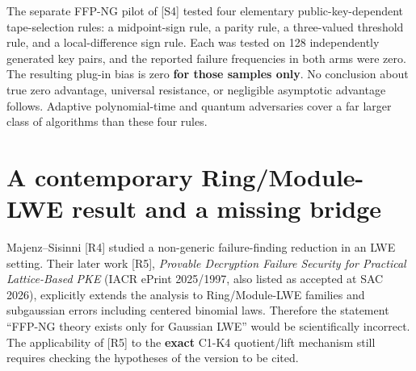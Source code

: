 \documentclass[
  11pt,
  a4paper,
  oneside]{report}
\begin{document}
The separate FFP-NG pilot of {[}S4{]} tested four elementary
public-key-dependent tape-selection rules: a midpoint-sign rule, a
parity rule, a three-valued threshold rule, and a local-difference sign
rule. Each was tested on 128 independently generated key pairs, and the
reported failure frequencies in both arms were zero. The resulting
plug-in bias is zero \textbf{for those samples only}. No conclusion
about true zero advantage, universal resistance, or negligible
asymptotic advantage follows. Adaptive polynomial-time and quantum
adversaries cover a far larger class of algorithms than these four
rules.

\section{A contemporary Ring/Module-LWE result and a missing
bridge}\label{a-contemporary-ringmodule-lwe-result-and-a-missing-bridge}

Majenz--Sisinni {[}R4{]} studied a non-generic failure-finding reduction
in an LWE setting. Their later work {[}R5{]}, \emph{Provable Decryption
Failure Security for Practical Lattice-Based PKE} (IACR ePrint
2025/1997, also listed as accepted at SAC 2026), explicitly extends the
analysis to Ring/Module-LWE families and subgaussian errors including
centered binomial laws. Therefore the statement ``FFP-NG theory exists
only for Gaussian LWE'' would be scientifically incorrect. The
applicability of {[}R5{]} to the \textbf{exact} C1-K4 quotient/lift
mechanism still requires checking the hypotheses of the version to be
cited.
\end{document}
